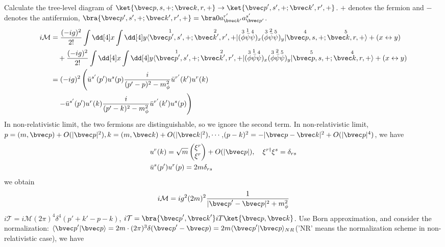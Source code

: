 Calculate the tree-level diagram of $\ket{{\bvec p},s,+;{\bvec k},r,+}\rightarrow \ket{{\bvec p}',s',+;{\bvec k}',r',+}$. $+$ denotes the fermion and $-$ denotes the antifermion, $\bra{\bvec p',s',+;\bvec k',r',+}=\bra 0 a_{\bvec k'}^{r'} a_{\bvec p'}^{s'}$.
\begin{equation}
\begin{aligned}
\notag i\mathcal{M}&=
\frac{(-ig)^2}{2!}\int \dd[4]x \int  \dd[4]y 
{
\langle\overset{1}{\bvec p',s',+};\overset{2}{\bvec k',r',+}|
(\overset{3}\phi  \overset{1}{\bar{\psi}} \overset{4}\psi)_x 
(\overset{3}\phi \overset{2}{\bar{\psi}} \overset{5}\psi)_y
|\overset{4}{\bvec p,s,+};\overset{5}{\bvec k,r,+} \rangle
}+(x\leftrightarrow y)\\
&\quad +
\frac{(-ig)^2}{2!}\int \dd[4]x \int  \dd[4]y 
\langle\overset{1}{\bvec p',s',+};\overset{2}{\bvec k',r',+}|
(\overset{3}\phi  \overset{1}{\bar{\psi}} \overset{4}\psi)_x 
(\overset{3}\phi \overset{2}{\bar{\psi}} \overset{5}\psi)_y
|\overset{5}{\bvec p,s,+};\overset{4}{\bvec k,r,+} \rangle
+(x\leftrightarrow y)\\
&=(-ig)^2\left(
 \bar u^{s'}(p')u^s(p) \frac{i}{(p'-p)^2-m_{\phi}^2} \bar u^{r'}(k') u^r(k)
\right.\\
&\left.\quad 
-\bar u^{s'}(p')u^r(k) \frac{i}{(p'-k)^2-m_{\phi}^2} \bar u^{r'}(k') u^{s}(p)  \right)
\end{aligned}
\end{equation}
In non-relativistic limit, the two fermions are distinguishable, so we ignore the second term. In non-relativistic limit, $p=(m,{\bvec p})+O(|{\bvec p}|^2),k=(m,{\bvec k})+O(|{\bvec k}|^2),\cdots$,$(p-k)^2=-|{\bvec p}-{\bvec k}|^2+O(|{\bvec p}|^4)$, we have \begin{align*}
&u^r(k)=\sqrt{m} \begin{pmatrix}\xi^r\\ \xi^r\end{pmatrix}+O(|{\bvec p}|),\quad  \xi^{r\dagger}\xi^s=\delta_{rs}\\
&\bar u^s(p') u^r(p)=2m \delta_{rs}
\end{align*}
we obtain
\begin{equation}
\begin{aligned}
i\mathcal{M} = i g^2 (2m)^2 \frac{1}{|{\bvec p}'-{\bvec p}|^2+m_\phi^2}
\end{aligned}
\end{equation}
$i\mathcal{T}=i\mathcal{M}(2\pi)^4 \delta^4(p'+k'-p-k)$, $i\mathcal{T} = \bra{{\bvec p}',{\bvec k}'}iT\ket{{\bvec p},{\bvec k}}$. Use Born approximation, and consider the normalization: $\langle{\bvec p}'|{\bvec p}\rangle=2m\cdot (2\pi)^3 \delta({\bvec p}'-{\bvec p}) = 2m \langle{\bvec p}'|{\bvec p}\rangle_{NR}$('NR' means the normalization scheme in non-relativistic case), we have
